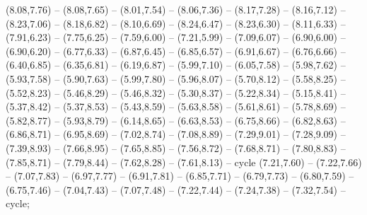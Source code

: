 { (8.08,7.76) -- (8.08,7.65) -- (8.01,7.54) -- (8.06,7.36) -- (8.17,7.28) -- (8.16,7.12) -- (8.23,7.06) -- (8.18,6.82) -- (8.10,6.69) -- (8.24,6.47) -- (8.23,6.30) -- (8.11,6.33) -- (7.91,6.23) -- (7.75,6.25) -- (7.59,6.00) -- (7.21,5.99) -- (7.09,6.07) -- (6.90,6.00) -- (6.90,6.20) -- (6.77,6.33) -- (6.87,6.45) -- (6.85,6.57) -- (6.91,6.67) -- (6.76,6.66) -- (6.40,6.85) -- (6.35,6.81) -- (6.19,6.87) -- (5.99,7.10) -- (6.05,7.58) -- (5.98,7.62) -- (5.93,7.58) -- (5.90,7.63) -- (5.99,7.80) -- (5.96,8.07) -- (5.70,8.12) -- (5.58,8.25) -- (5.52,8.23) -- (5.46,8.29) -- (5.46,8.32) -- (5.30,8.37) -- (5.22,8.34) -- (5.15,8.41) -- (5.37,8.42) -- (5.37,8.53) -- (5.43,8.59) -- (5.63,8.58) -- (5.61,8.61) -- (5.78,8.69) -- (5.82,8.77) -- (5.93,8.79) -- (6.14,8.65) -- (6.63,8.53) -- (6.75,8.66) -- (6.82,8.63) -- (6.86,8.71) -- (6.95,8.69) -- (7.02,8.74) -- (7.08,8.89) -- (7.29,9.01) -- (7.28,9.09) -- (7.39,8.93) -- (7.66,8.95) -- (7.65,8.85) -- (7.56,8.72) -- (7.68,8.71) -- (7.80,8.83) -- (7.85,8.71) -- (7.79,8.44) -- (7.62,8.28) -- (7.61,8.13) -- cycle (7.21,7.60) -- (7.22,7.66) -- (7.07,7.83) -- (6.97,7.77) -- (6.91,7.81) -- (6.85,7.71) -- (6.79,7.73) -- (6.80,7.59) -- (6.75,7.46) -- (7.04,7.43) -- (7.07,7.48) -- (7.22,7.44) -- (7.24,7.38) -- (7.32,7.54) -- cycle;
}
